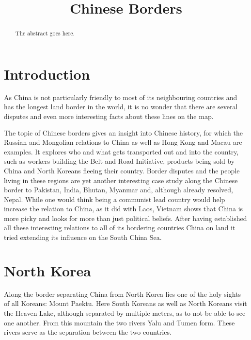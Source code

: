 \documentclass[conference]{IEEEtran}
\begin{document}
	
	\title{Chinese Borders}
	
	\author{
	}
	
	\maketitle
	
	\begin{abstract}
		The abstract goes here.
	\end{abstract}
	
	\section{Introduction}
	As China is not particularly friendly to most of its neighbouring countries and has the longest land border in the world, it is no wonder that there are several disputes and even more interesting facts about these lines on the map.
	
	The topic of Chinese borders gives an insight into Chinese history, for which the Russian and Mongolian relations to China as well as Hong Kong and Macau are examples. It explores who and what gets transported out and into the country, such as workers building the Belt and Road Initiative, products being sold by China and North Koreans fleeing their country. Border disputes and the people living in these regions are yet another interesting case study along the Chinese border to Pakistan, India, Bhutan, Myanmar and, although already resolved, Nepal. While one would think being a communist lead country would help increase the relation to China, as it did with Laos, Vietnam shows that China is more picky and looks for more than just political beliefs. After having established all these interesting relations to all of its bordering countries China on land it tried extending its influence on the South China Sea. 
	
	\section{North Korea}
	Along the border separating China from North Korea lies one of the holy sights of all Koreans: Mount Paektu. \cite{theIndianExpress_explainedWhatIsTheSignificanceOfMtPeaktuForKinJongUn} Here South Koreans as well as North Koreans visit the Heaven Lake, although separated by multiple meters, as to not be able to see one another. From this mountain the two rivers Yalu and Tumen form. These rivers serve as the separation between the two countries.
	
\end{document}
